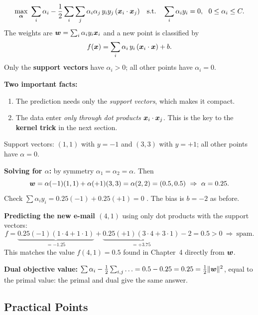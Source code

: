 \begin{definition}
\[
  \max_{\vect\alpha}\ \sum_{i}\alpha_i-\frac12\sum_{i}\sum_{j}\alpha_i\alpha_j\,y_iy_j\,(\vect x_i\cdot\vect x_j)
  \quad\text{s.t.}\quad \sum_i\alpha_iy_i=0,\ \ 0\le\alpha_i\le C .
\]
The weights are $\boldsymbol{w}=\sum_i\alpha_iy_i\boldsymbol{x}_i$ and a new point is classified by
\[
  f(\boldsymbol{x})=\sum_{i}\alpha_i\,y_i\,(\boldsymbol{x}_i\cdot\boldsymbol{x})+b .
\]
Only the \textbf{support vectors} have $\alpha_i>0$; all other points have $\alpha_i=0$.
\end{definition}

\textbf{Two important facts:}
\begin{enumerate}
  \item The prediction needs only the \emph{support vectors}, which makes it compact.
  \item The data enter \emph{only through dot products} $\boldsymbol{x}_i\cdot\boldsymbol{x}_j$. This is the key to the \textbf{kernel trick} in the next section.
\end{enumerate}

\begin{example}
Support vectors: $(1,1)$ with $y=-1$ and $(3,3)$ with $y=+1$; all other points have $\alpha=0$.

\medskip
\textbf{Solving for $\alpha$:} by symmetry $\alpha_1=\alpha_2=\alpha$. Then
\[
  \vect w=\alpha(-1)(1,1)+\alpha(+1)(3,3)=\alpha(2,2)=(0.5,0.5)\ \Rightarrow\ \alpha=0.25 .
\]
Check $\sum\alpha_iy_i=0.25(-1)+0.25(+1)=0$ \checkmark. The bias is $b=-2$ as before.

\medskip
\textbf{Predicting the new e-mail $(4,1)$} using only dot products with the support vectors:
\[
  f=\underbrace{0.25(-1)(1\cdot4+1\cdot1)}_{=-1.25}+\underbrace{0.25(+1)(3\cdot4+3\cdot1)}_{=+3.75}-2=\mathbf{0.5}>0\ \Rightarrow\ \text{spam}.
\]
This matches the value $f(4,1)=0.5$ found in Chapter~4 directly from $\boldsymbol{w}$.

\medskip
\textbf{Dual objective value:} $\sum\alpha_i-\frac12\sum_{i,j}\ldots=0.5-0.25=0.25=\frac12\|\boldsymbol{w}\|^2$, equal to the primal value: the primal and dual give the same answer.
\end{example}

\subsection{Practical Points}

